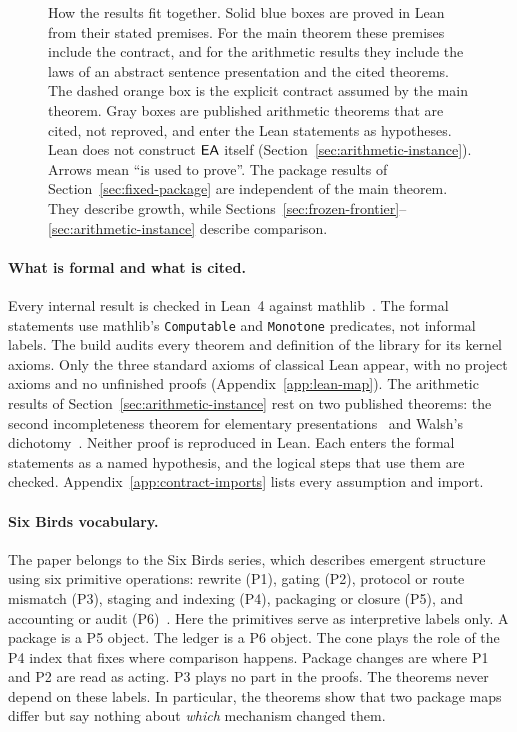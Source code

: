 \begin{figure}[t]
\centering

\caption{How the results fit together. Solid blue boxes are proved in Lean from their stated premises. For the main theorem these premises include the contract, and for the arithmetic results they include the laws of an abstract sentence presentation and the cited theorems. The dashed orange box is the explicit contract assumed by the main theorem. Gray boxes are published arithmetic theorems that are cited, not reproved, and enter the Lean statements as hypotheses. Lean does not construct $\mathsf{EA}$ itself (Section~\ref{sec:arithmetic-instance}). Arrows mean ``is used to prove''. The package results of Section~\ref{sec:fixed-package} are independent of the main theorem. They describe growth, while Sections~\ref{sec:frozen-frontier}--\ref{sec:arithmetic-instance} describe comparison.}
\label{fig:architecture}
\end{figure}

\paragraph{What is formal and what is cited.}
Every internal result is checked in Lean~4 against mathlib~\cite{deMouraUllrich2021,Mathlib2020}. The formal statements use mathlib's \texttt{Computable} and \texttt{Monotone} predicates, not informal labels. The build audits every theorem and definition of the library for its kernel axioms. Only the three standard axioms of classical Lean appear, with no project axioms and no unfinished proofs (Appendix~\ref{app:lean-map}). The arithmetic results of Section~\ref{sec:arithmetic-instance} rest on two published theorems: the second incompleteness theorem for elementary presentations~\cite{ArtemovBeklemishev2005} and Walsh's dichotomy~\cite{Walsh2020Note}. Neither proof is reproduced in Lean. Each enters the formal statements as a named hypothesis, and the logical steps that use them are checked. Appendix~\ref{app:contract-imports} lists every assumption and import.

\paragraph{Six Birds vocabulary.}
The paper belongs to the Six Birds series, which describes emergent structure using six primitive operations: rewrite (P1), gating (P2), protocol or route mismatch (P3), staging and indexing (P4), packaging or closure (P5), and accounting or audit (P6)~\cite{Tsiokos2026Foundations,Tsiokos2026ToCount}. Here the primitives serve as interpretive labels only. A package is a P5 object. The ledger is a P6 object. The cone plays the role of the P4 index that fixes where comparison happens. Package changes are where P1 and P2 are read as acting. P3 plays no part in the proofs. The theorems never depend on these labels. In particular, the theorems show that two package maps differ but say nothing about \emph{which} mechanism changed them.

